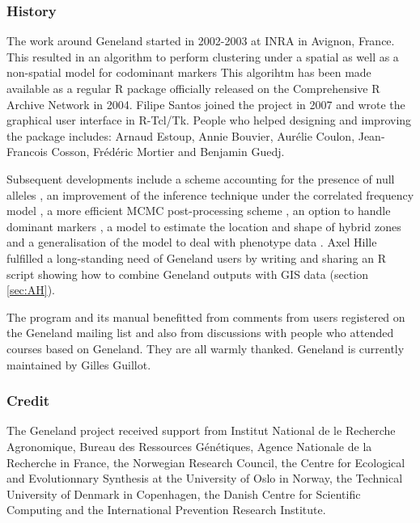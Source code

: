 \documentclass{article}
\begin{document}
\subsubsection{History}
The work around {\sc Geneland} started in 2002-2003  at INRA in Avignon, France. 
This resulted in an algorithm to perform clustering under a spatial as well as a non-spatial model 
for codominant markers 
This algorihtm has been made available as a regular R package officially released on the Comprehensive R Archive Network in 2004. 
Filipe Santos joined the project in 2007 and wrote  the gra\-phical user interface in R-Tcl/Tk.
People who helped designing and improving the package includes:  
Arnaud Estoup, Annie Bouvier, Aur\'elie Coulon, Jean-Francois Cosson, Fr\'ed\'eric Mortier and Benjamin Guedj. 


Subsequent developments include a scheme accounting for the presence of null alleles \citep{Guillot08a}, 
an improvement of the  inference technique under the correlated frequency model \citep{Guillot08b}, 
a more efficient MCMC post-processing scheme \citep{Guillot08b}, 
an option to handle dominant markers \citep{Guillot10b}, 
a model to estimate the location and shape of hybrid zones \citep{Guedj11} 
and a generalisation of the model to deal with phenotype data \citep{Guillot12a}.
Axel Hille fulfilled a long-standing need of Geneland users by writing and sharing an R script showing how to 
combine {\sc Geneland} outputs with GIS data (section \ref{sec:AH}).

The program and its manual benefitted from comments from users registered on the {\sc Geneland} mailing list and also 
from discussions with people who attended courses  based on {\sc Geneland}. 
They are all warmly thanked.
 {\sc Geneland} is currently maintained by  Gilles Guillot. 

\subsubsection{Credit}
The {\sc Geneland} project received support from Institut National de le Recherche Agronomique, Bureau des Ressources G\'en\'etiques, 
Agence Nationale de la Recherche in France,  
the Norwegian Research Council, the Centre for Ecological and Evolutionnary Synthesis at the University of Oslo in Norway, 
the Technical University of Denmark in Copenhagen, the Danish Centre for Scientific Computing and the International Prevention Research Institute. 


\end{document}
